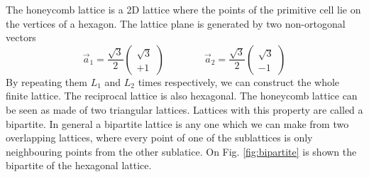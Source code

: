 The honeycomb lattice is a 2D lattice where the points of the primitive cell lie on the vertices of a hexagon. The lattice plane is generated by two non-ortogonal vectors
\begin{equation}
  \vec{a}_1 = \frac{\sqrt{3}}{2}
  \begin{pmatrix}
    \sqrt{3} \\
    +1
  \end{pmatrix} \qquad \qquad
  \vec{a}_2 = \frac{\sqrt{3}}{2}
  \begin{pmatrix}
    \sqrt{3} \\
    -1
  \end{pmatrix}
\end{equation}
By repeating them $L_1$ and $L_2$ times respectively, we can construct the whole finite lattice. The reciprocal lattice is also hexagonal. The honeycomb lattice can be seen as made of two triangular lattices. Lattices with this property are called a bipartite. In general a bipartite lattice is any one which we can make from two overlapping lattices, where every point of one of the sublattices is only neighbouring points from the other sublatice. On Fig. \ref{fig:bipartite} is shown the bipartite of the hexagonal lattice.
